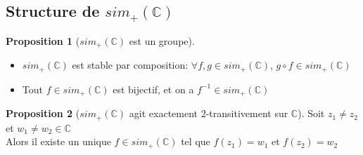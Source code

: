 \documentclass[10pt,a4paper]{article}
\theoremstyle{definition}
\newtheorem{proposition}{Proposition}[section]
\begin{document}
\subsection{Structure de $sim_+(\mathbb{C})$}
\begin{proposition}[$sim_+(\mathbb{C})$ est un groupe]
\hfill
\begin{itemize}
\item $sim_+(\mathbb{C})$ est stable par composition: $\forall f, g \in sim_+(\mathbb{C})$, $g \circ f \in sim_+(\mathbb{C})$
\item Tout $f \in sim_+(\mathbb{C})$ est bijectif, et on a $f^{-1} \in sim_+(\mathbb{C})$
\end{itemize}
\end{proposition}
\begin{proposition}[$sim_+(\mathbb{C})$ agit exactement $2$-transitivement sur $\mathbb{C}$]
Soit $z_1 \neq z_2$ et $w_1 \neq w_2 \in \mathbb{C}$ \\
Alors il existe un unique $f \in sim_+(\mathbb{C})$ tel que $f(z_1) = w_1$ et $f(z_2) = w_2$
\end{proposition}
\end{document}
